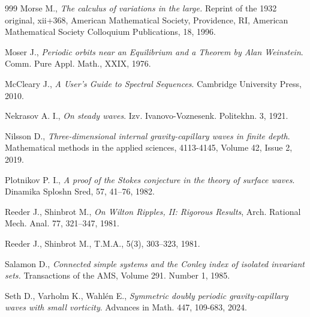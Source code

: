 \documentclass[11pt,a4paper,reqno]{article}
\numberwithin{equation}{section}
\theoremstyle{definition}
\begin{document}
\begin{footnotesize}
\begin{thebibliography}{999}
Morse M., 
{\it The calculus of variations in the large.} Reprint of the 1932 original,
xii+368, 
American Mathematical Society, Providence, RI,
American Mathematical Society Colloquium Publications, 18, 1996.


    Moser J., {\it Periodic orbits near an Equilibrium and a Theorem by Alan Weinstein}.  Comm. Pure  Appl. Math., XXIX, 1976.

 McCleary J., {\it A User's Guide to Spectral Sequences}. Cambridge University Press, 2010.

		Nekrasov A. I.,  {\it On steady waves}.  Izv. Ivanovo-Voznesenk. Politekhn. 3, 1921.

Nilsson D., 
{\it Three-dimensional internal gravity-capillary waves in
finite depth}. Mathematical methods in the applied sciences, 
4113-4145, Volume 42, Issue 2,  2019.




    Plotnikov P. I., {\it A proof of the Stokes conjecture in the theory of surface waves}. Dinamika Sploshn Sred, 57, 41–76, 1982.

 
    
     Reeder J., Shinbrot M., 
{\it On Wilton Ripples, II: Rigorous Results}, 
Arch. Rational Mech. Anal. 77, 321–347, 1981.

     Reeder J., Shinbrot M.,   T.M.A., 5(3), 303--323, 1981.

 Salamon D., {\it Connected simple systems and the Conley index of isolated invariant sets.} Transactions of the AMS, Volume 291. Number 1, 1985.

Seth D., 
Varholm K., 
Wahl\'en E., 
{\it Symmetric doubly periodic gravity-capillary waves
with small vorticity}. 
Advances in Math. 447,  109-683, 2024. 



\end{thebibliography}
\end{footnotesize}
\end{document}

